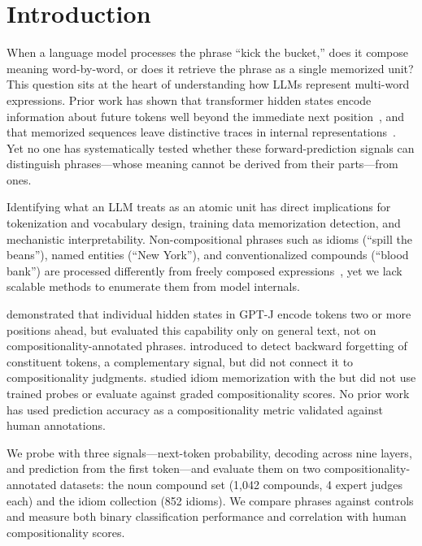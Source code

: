 \section{Introduction}
\label{sec:intro}

When a language model processes the phrase ``kick the bucket,'' does it compose meaning word-by-word, or does it retrieve the phrase as a single memorized unit?
This question sits at the heart of understanding how LLMs represent multi-word expressions.
Prior work has shown that transformer hidden states encode information about future tokens well beyond the immediate next position~\citep{pal2023future}, and that memorized sequences leave distinctive traces in internal representations~\citep{haviv2022understanding}.
Yet no one has systematically tested whether these forward-prediction signals can distinguish \noncomp phrases---whose meaning cannot be derived from their parts---from \comp ones.

Identifying what an LLM treats as an atomic unit has direct implications for tokenization and vocabulary design, training data memorization detection, and mechanistic interpretability.
Non-compositional phrases such as idioms (``spill the beans''), named entities (``New York''), and conventionalized compounds (``blood bank'') are processed differently from freely composed expressions~\citep{miletic2024systematic}, yet we lack scalable methods to enumerate them from model internals.

\citet{pal2023future} demonstrated that individual hidden states in GPT-J encode tokens two or more positions ahead, but evaluated this capability only on general text, not on compositionality-annotated phrases.
\citet{feucht2024token} introduced \tokenerasure to detect backward forgetting of constituent tokens, a complementary signal, but did not connect it to compositionality judgments.
\citet{haviv2022understanding} studied idiom memorization with the \logitlens but did not use trained probes or evaluate against graded compositionality scores.
No prior work has used \futurelens prediction accuracy as a compositionality metric validated against human annotations.

We probe \gptxl with three signals---next-token probability, \logitlens decoding across nine layers, and \futurelens prediction from the first token---and evaluate them on two compositionality-annotated datasets: the \farahmand noun compound set (1,042 compounds, 4 expert judges each) and the \idiomem idiom collection (852 idioms).
We compare \noncomp phrases against \comp controls and measure both binary classification performance and correlation with human compositionality scores.

